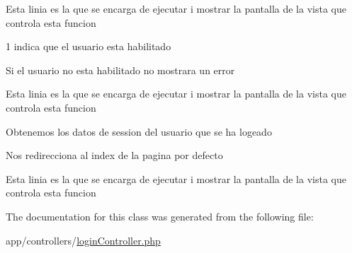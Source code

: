 Esta linia es la que se encarga de ejecutar i mostrar la pantalla de la vista que controla esta funcion

1 indica que el usuario esta habilitado

Si el usuario no esta habilitado no mostrara un error

Esta linia es la que se encarga de ejecutar i mostrar la pantalla de la vista que controla esta funcion

Obtenemos los datos de session del usuario que se ha logeado

Nos redirecciona al index de la pagina por defecto

Esta linia es la que se encarga de ejecutar i mostrar la pantalla de la vista que controla esta funcion 

The documentation for this class was generated from the following file\+:\begin{DoxyCompactItemize}
\item 
app/controllers/\hyperlink{login_controller_8php}{login\+Controller.\+php}\end{DoxyCompactItemize}
